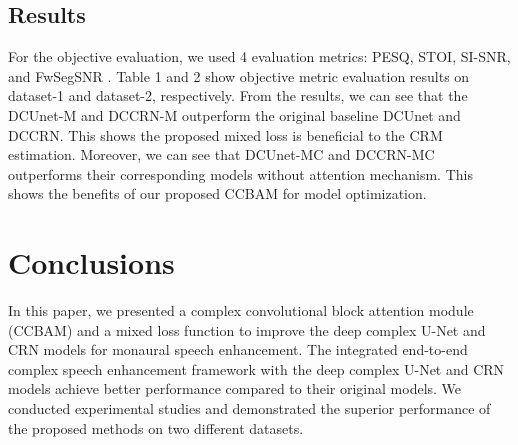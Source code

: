 \documentclass{article}
\begin{document}
\subsection{Results}
For the objective evaluation, we used 4 evaluation metrics: PESQ, STOI, SI-SNR, and FwSegSNR \cite{Hu2008}. Table 1 and 2 show objective metric evaluation results on dataset-1 and dataset-2, respectively. From the results, we can see that the DCUnet-M and DCCRN-M outperform the original baseline DCUnet and DCCRN. This shows the proposed mixed loss is beneficial to the CRM estimation. Moreover, we can see that DCUnet-MC and DCCRN-MC outperforms their corresponding models without attention mechanism. This shows the benefits of our proposed CCBAM for model optimization.
\section{Conclusions}
In this paper, we presented a complex convolutional block attention module (CCBAM) and a mixed loss function to improve the deep complex U-Net and CRN models for monaural speech enhancement. The integrated end-to-end complex speech enhancement framework with the deep complex U-Net and CRN models achieve better performance compared to their original models. We conducted experimental studies and demonstrated the superior performance of the proposed methods on two different datasets.


\end{document}
